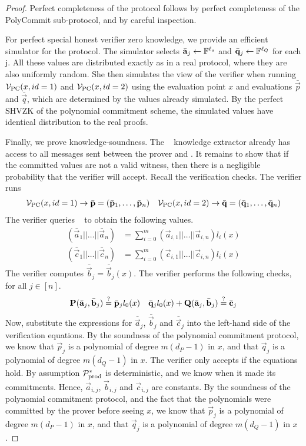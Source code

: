 \begin{proof}
Perfect completeness of the protocol follows by perfect completeness of the PolyCommit sub-protocol, and by careful inspection.

For perfect special honest verifier zero knowledge, we provide an efficient simulator for the protocol. The simulator selects $\bar{\mathbf{a}}_j \gets \mathbb{F}^{\ell_a}$ and $\bar{\mathbf{q}}_j\gets \mathbb{F}^{\ell_Q}$ for each j. All these values are distributed exactly as in a real protocol, where they are also uniformly random. She then simulates the view of the verifier when running $\mathcal{V}_\mathrm{PC}(x,id=1)$ and $\mathcal{V}_\mathrm{PC}(x,id=2)$ using the evaluation point $x$ and evaluations $\bar{\vec{p}}$ and $\bar{\vec{q}}$, which are determined by the values already simulated. By the perfect SHVZK of the polynomial commitment scheme, the simulated values have identical distribution to the real proofs.

Finally, we prove knowledge-soundness. The \ILC~ knowledge extractor already has access to all messages sent between the prover and \ILC. It remains to show that if the committed values are not a valid witness, then there is a negligible probability that the verifier will accept.
Recall the verification checks. The verifier runs
\begin{align*}
\mathcal{V}_\mathrm{PC}(x,id=1) \to \bar{\mathbf{p}}=(\bar{\mathbf{p}}_1,\ldots,\bar{\mathbf{p}}_n) &&
\mathcal{V}_\mathrm{PC}(x,id=2) \to \bar{\mathbf{q}}=(\bar{\mathbf{q}}_1,\ldots,\bar{\mathbf{q}}_n)
\end{align*}
The verifier queries \ILC~ to obtain the following values.
\begin{align*}
(\bar{\vec{a}}_1||\ldots||\bar{\vec{a}}_n) &= \sum_{i=0}^m ( \vec{a}_{i,1}||\ldots||\vec{a}_{i,n}) {l_i(x)} \\
(\bar{\vec{c}}_1||\ldots||\bar{\vec{c}}_n) &= \sum_{i=0}^m ( \vec{c}_{i,1}||\ldots||\vec{c}_{i,n}) {l_i(x)}
\end{align*}
The verifier computes $\bar{\vec{b}}_j=\bar{\vec{b}}_j(x)$. The verifier performs the following checks, for all $j \in [n]$.
\begin{align*}
\mathbf{P}(\bar{\mathbf{a}}_j,\bar{\mathbf{b}}_j) \overset{?}{=} \bar{\mathbf{p}}_jl_0(x) &&
\bar{\mathbf{q}}_jl_0(x)+\mathbf{Q}(\bar{\mathbf{a}}_j,\bar{\mathbf{b}}_j) \overset{?}{=} \bar{\mathbf{c}}_j
\end{align*}
Now, substitute the expressions for $\bar{\vec{a}}_j$, $\bar{\vec{b}}_j$ and $\bar{\vec{c}}_j$ into the left-hand side of the verification equations. By the soundness of the polynomial commitment protocol, we know that $\vec{p}_j$ is a polynomial of degree $m (d_P-1)$ in $x$, and that $\vec{q}_j$ is a polynomial of degree $m(d_Q-1)$ in $x$. The verifier only accepts if the equations hold. By assumption $\mathcal{P}^*_{\textnormal{prod}}$ is deterministic, and we know when it made its commitments. Hence, $\vec{a}_{i,j}$, $\vec{b}_{i,j}$ and $\vec{c}_{i,j}$ are constants. By the soundness of the polynomial commitment protocol, and the fact that the polynomials were committed by the prover before seeing $x$, we know that $\vec{p}_j$ is a polynomial of degree $m (d_P-1)$ in $x$, and that $\vec{q}_j$ is a polynomial of degree $m(d_Q-1)$ in $x$.


\end{proof}
